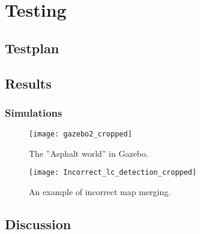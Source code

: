 \chapter{Testing}
\label{chp:testing} 

\section{Testplan}

\section{Results}

\subsection{Simulations}


\begin{figure}[p]
	\centering
	\texttt{[image: gazebo2\_cropped]}
	\caption{The ''Asphalt world'' in Gazebo. }
	\label{fig:Incorrect_lc_detection}
\end{figure}

\begin{figure}[p]
	\centering
	\texttt{[image: Incorrect\_lc\_detection\_cropped]}
	\caption{An example of incorrect map merging. }
	\label{fig:Incorrect_lc_detection}
\end{figure}


\section{Discussion}